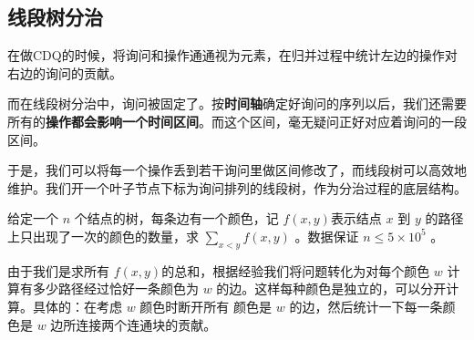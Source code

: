 \subsection{线段树分治}

\par \noindent 在做CDQ的时候，将询问和操作通通视为元素，在归并过程中统计左边的操作对右边的询问的贡献。
~\\
\par \noindent 而在线段树分治中，询问被固定了。按\textbf{时间轴}确定好询问的序列以后，我们还需要所有的\textbf{操作都会影响一个时间区间}。而这个区间，毫无疑问正好对应着询问的一段区间。
~\\
\par \noindent 于是，我们可以将每一个操作丢到若干询问里做区间修改了，而线段树可以高效地维护。我们开一个叶子节点下标为询问排列的线段树，作为分治过程的底层结构。
\begin{tcolorbox}
\par 给定一个 $n$ 个结点的树，每条边有一个颜色，记 $f(x,y)$表示结点 $x$ 到 $y$ 的路径上只出现了一次的颜色的数量，求 $\sum\limits_{x < y}f(x, y)$ 。数据保证 $n \le 5 \times 10^5$ 。

\par \noindent 由于我们是求所有 $f(x,y)$的总和，根据经验我们将问题转化为对每个颜色 $w$ 计算有多少路径经过恰好一条颜色为 $w$ 的边。这样每种颜色是独立的，可以分开计算。具体的：在考虑 $w$ 颜色时断开所有 颜色是 $w$ 的边，然后统计一下每一条颜色是 $w$ 边所连接两个连通块的贡献。

\end{tcolorbox}
